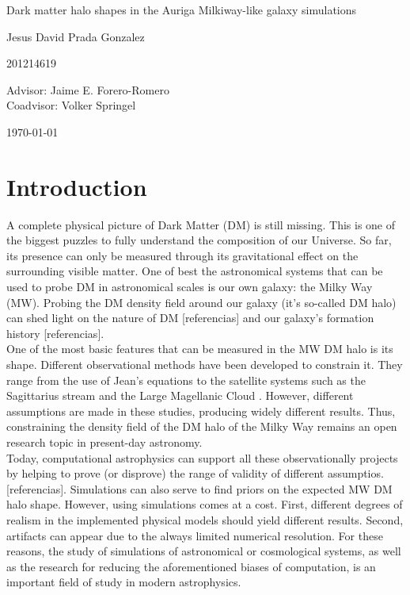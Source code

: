 \documentclass[12pt]{article}
\begin{document}
\begin{center}
\Huge
Dark matter halo shapes in the Auriga Milkiway-like galaxy simulations

\vspace{3mm}
\Large Jesus David Prada Gonzalez

\large
201214619


\vspace{2mm}
\Large
Advisor: Jaime E. Forero-Romero\\
Coadvisor: Volker Springel
\normalsize
\vspace{2mm}

\today
\end{center}


\normalsize
\section{Introduction}


A complete physical picture of Dark Matter (DM) is still missing.
This is one of the biggest puzzles to fully understand the composition of our Universe.
So far, its presence can only be measured through its gravitational effect on the surrounding visible matter. 
One of best the astronomical systems that can be used to probe DM in astronomical scales is our own galaxy: the Milky Way (MW).
Probing the DM density field around our galaxy (it's so-called DM halo) can shed light on the nature of DM [referencias] and our galaxy's formation history [referencias].\\

One of the most basic features that can be measured in the MW DM halo is its shape. 
Different observational methods have been developed to constrain it. 
They range from the use of Jean's equations \cite{Loebman2012} to the satellite systems such as the Sagittarius stream and the Large Magellanic Cloud \cite{Vera-Ciro2013,Deg2012,LawMajewski2010}. 
However, different assumptions are made in these studies, producing widely different results.
Thus, constraining the density field of the DM halo of the Milky Way remains an open research topic in present-day astronomy.\\ 

Today, computational astrophysics can support all these observationally projects by helping to prove (or disprove) the range of validity of different assumptios. [referencias].
Simulations can also serve to find priors on the expected MW DM halo shape.
However, using simulations comes at a cost.
First, different degrees of realism in the implemented physical models should yield different results.
Second, artifacts can appear due to the always limited numerical resolution. 
For these reasons, the study of simulations of astronomical or cosmological systems, as well as the research for reducing the aforementioned biases of computation, is an important field of study in modern astrophysics.\\
\end{document}
